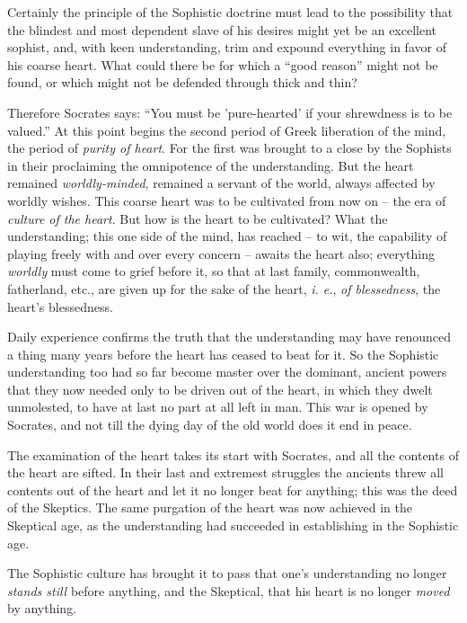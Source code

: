 \documentclass[12pt,a4paper]{book}
\begin{document}
Certainly the principle of the Sophistic doctrine must lead to the possibility 
that the blindest and most dependent slave of his desires might yet be an 
excellent sophist, and, with keen understanding, trim and expound everything 
in favor of his coarse heart. What could there be for which a ``good 
reason'' might not be found, or which might not be defended through thick and 
thin?

Therefore Socrates says: ``You must be 'pure-hearted' if your shrewdness is 
to be valued.'' At this point begins the second period of Greek liberation of 
the mind, the period of \textit{purity of heart}. For the first was brought to 
a close by the Sophists in their proclaiming the omnipotence of the 
understanding. But the heart remained \textit{worldly-minded}, remained a 
servant of the world, always affected by worldly wishes. This coarse heart was 
to be cultivated from now on -- the era of \textit{culture of the heart}. But 
how is the heart to be cultivated? What the understanding; this one side of 
the mind, has reached -- to wit, the capability of playing freely with and 
over every concern -- awaits the heart also; everything \textit{worldly} must 
come to grief before it, so that at last family, commonwealth, fatherland, 
etc., are given up for the sake of the heart, \textit{i. e.}, \textit{of 
blessedness}, the heart's blessedness.

Daily experience confirms the truth that the understanding may have renounced 
a thing many years before the heart has ceased to beat for it. So the 
Sophistic understanding too had so far become master over the dominant, 
ancient powers that they now needed only to be driven out of the heart, in 
which they dwelt unmolested, to have at last no part at all left in man. This 
war is opened by Socrates, and not till the dying day of the old world does it 
end in peace.

The examination of the heart takes its start with Socrates, and all the 
contents of the heart are sifted. In their last and extremest struggles the 
ancients threw all contents out of the heart and let it no longer beat for 
anything; this was the deed of the Skeptics. The same purgation of the heart 
was now achieved in the Skeptical age, as the understanding had succeeded in 
establishing in the Sophistic age.

The Sophistic culture has brought it to pass that one's understanding no 
longer \textit{stands still} before anything, and the Skeptical, that his 
heart is no longer \textit{moved} by anything.
\end{document}
